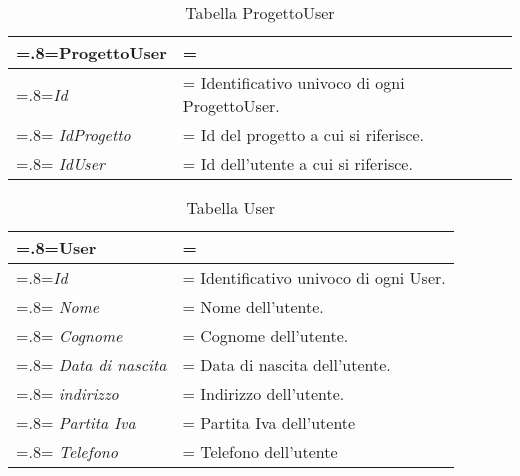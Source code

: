  \begin{table}[H]
                \centering
                \renewcommand{\arraystretch}{1.8}
                \renewcommand\tabularxcolumn[1]{m{#1}}
                \begin{tabularx}{0.9\textwidth} {
                    >{\hsize=.8\hsize\linewidth=\hsize}X
                    >{\hsize=1.2\hsize\linewidth=\hsize}X}
                    \textbf{ProgettoUser}\\
                    \hline
                    \textit{Id} & Identificativo univoco di ogni ProgettoUser. \\
                    \hline
                    \textit{IdProgetto} & Id del progetto a cui si riferisce.  \\
                    \hline
                    \textit{IdUser} & Id dell'utente a cui si riferisce. \\
                    \hline
                \end{tabularx}
                \smallskip
                \caption{Tabella ProgettoUser}
            \end{table}   
                 
    			\smallskip 
            \begin{table}[H]
                \centering
                \renewcommand{\arraystretch}{1.8}
                \renewcommand\tabularxcolumn[1]{m{#1}}
                \begin{tabularx}{0.9\textwidth} {
                    >{\hsize=.8\hsize\linewidth=\hsize}X
                    >{\hsize=1.2\hsize\linewidth=\hsize}X}
                    \textbf{User}\\
                    \hline
                    \textit{Id} & Identificativo univoco di ogni User. \\
                    \hline
                    \textit{Nome} & Nome dell'utente.  \\
                    \hline
                    \textit{Cognome} & Cognome dell'utente.  \\
                    \hline
                     \textit{Data di nascita} & Data di nascita dell'utente.  \\
                    \hline
                    \textit{indirizzo} & Indirizzo dell'utente.  \\
                    \hline
                    \textit{Partita Iva} & Partita Iva dell'utente \\
                    \hline
   	                \textit{Telefono} & Telefono dell'utente \\
                    \hline
                \end{tabularx}
                \smallskip
                \caption{Tabella User}
            \end{table}
            \smallskip 
            
